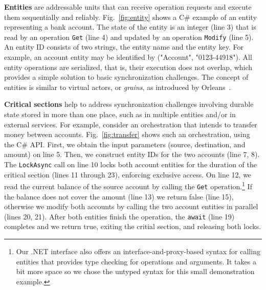 \vspace{.07in}\noindent\textbf{Entities} 
are addressable units that can receive operation requests and execute them sequentially and reliably.
Fig.~\ref{fig:entity} shows a C\# example of an entity representing a bank account. The state of the entity is an integer (line 3) that is read by an operation \texttt{Get} (line 4) and updated by an operation \texttt{Modify} (line 5). An entity ID consists of two strings, the entity name and the entity key. For example, an account entity may be identified by ("Account", "0123-44918"). All entity operations are serialized, that is, their execution does not overlap, which provides a simple solution to basic synchronization challenges. The concept of entities is similar to virtual actors, or \emph{grains}, as introduced by Orleans~\cite{bykov2011orleans}.  



\vspace{.07in}\noindent\textbf{Critical sections} help to address synchronization challenges involving durable state stored in more than one place, such as in multiple entities and/or in external services. For example, consider an orchestration that intends to transfer money between accounts. Fig.~\ref{fig:transfer} shows such an orchestration, using the C\# API. First, we obtain the input parameters (source, destination, and amount) on line 5. Then, we construct entity IDs for the two accounts (line 7, 8). The \texttt{LockAsync} call on line 10 locks both account entities for the duration of the critical section (lines 11 through 23), enforcing exclusive access. On line 12, we read the current balance of the source account by calling the \texttt{Get} operation.\footnote{Our .NET interface also offers an interface-and-proxy-based syntax for calling  entities that provides type checking for operations and arguments. It takes a bit more space so we chose the untyped syntax for this small demonstration example.} If the balance does not cover the amount (line 13) we return false (line 15), otherwise we modify both accounts by calling the two account entities in parallel (lines 20, 21). After both entities finish the operation, the \texttt{await} (line 19) completes and we return true, exiting the critial section, and releasing both locks.

